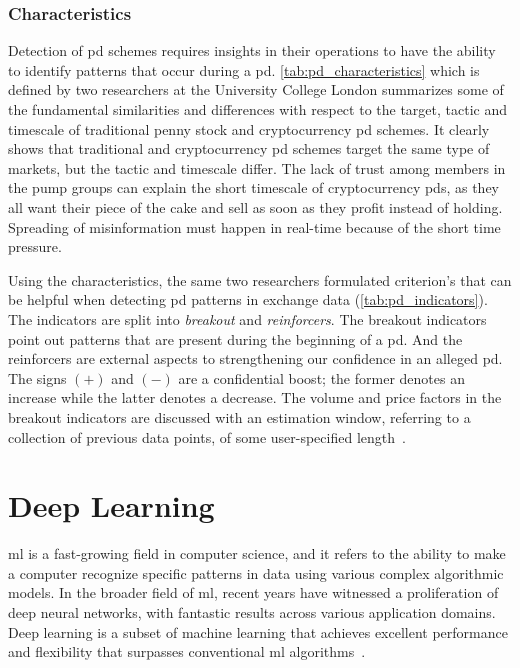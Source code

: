 \subsubsection{Characteristics}
Detection of \ac{pd} schemes requires insights in their operations to have the ability to identify patterns that occur during a \ac{pd}. \autoref{tab:pd_characteristics} which is defined by two researchers at the University College London \cite{P&D_anatomy} summarizes some of the fundamental similarities and differences with respect to the target, tactic and timescale of traditional penny stock and cryptocurrency \ac{pd} schemes. It clearly shows that traditional and cryptocurrency \ac{pd} schemes target the same type of markets, but the tactic and timescale differ. The lack of trust among members in the pump groups can explain the short timescale of cryptocurrency \acp{pd}, as they all want their piece of the cake and sell as soon as they profit instead of holding. Spreading of misinformation must happen in real-time because of the short time pressure.



Using the characteristics, the same two researchers \cite{P&D_anatomy} formulated criterion's that can be helpful when detecting \ac{pd} patterns in exchange data (\autoref{tab:pd_indicators}). The indicators are split into \emph{breakout} and \emph{reinforcers}. The breakout indicators point out patterns that are present during the beginning of a \ac{pd}. And the reinforcers are external aspects to strengthening our confidence in an alleged \ac{pd}. The signs $(+)$ and $(-)$ are a confidential boost; the former denotes an increase while the latter denotes a decrease. The volume and price factors in the breakout indicators are discussed with an estimation window, referring to a collection of previous data points, of some user-specified length~\cite{P&D_anatomy}.


 
\newpage
\section{Deep Learning}
\Acf{ml} is a fast-growing field in computer science, and it refers to the ability to make a computer recognize specific patterns in data using various complex algorithmic models. In the broader field of \ac{ml}, recent years have witnessed a proliferation of deep neural networks, with fantastic results across various application domains. Deep learning is a subset of machine learning that achieves excellent performance and flexibility that surpasses conventional \ac{ml} algorithms~\cite{mike_voets, dl_anomaly}.

